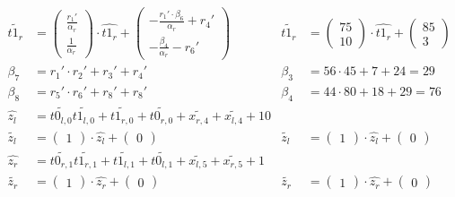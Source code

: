 \begin{align*}
%
\widetilde{t1_r} &=
\begin{pmatrix}
  \frac{r_1'}{\alpha_r}\\
  \frac{1}{\alpha_r}
\end{pmatrix}
\cdot \widehat{t1_r} +
\begin{pmatrix}
  -\frac{r_1' \cdot \beta_6}{\alpha_r} + r_4'\\
  -\frac{\beta_4}{\alpha_r}-r_6'
\end{pmatrix}
&
\widetilde{t1_r} &=
\begin{pmatrix}75\\10\end{pmatrix}
\cdot \widehat{t1_r} +
\begin{pmatrix}85\\3\end{pmatrix}\\
%
\beta_7 &= r_1' \cdot r_2' + r_3' + r_4'
&
 \beta_3 &= 56 \cdot 45 + 7 + 24 = 29\\
%
\beta_8 &= r_5' \cdot r_6' + r_8' + r_8'
&
\beta_4 &= 44 \cdot 80 + 18 + 29 = 76\\
%
\widehat{z_l} &=
\widetilde{t0_{l,0}}\widetilde{t1_{l,0}} +
\widetilde{t1_{r,0}} + \widetilde{t0_{r,0}} + \widetilde{x_{r,4}} +
\widetilde{x_{l,4}} + 10\\
%
\widetilde{z_l} &=
\begin{pmatrix}1\end{pmatrix}
\cdot \widehat{z_l} +
\begin{pmatrix}0\end{pmatrix}
&
\widetilde{z_l} &=
\begin{pmatrix}1\end{pmatrix}
\cdot \widehat{z_l} +
\begin{pmatrix}0\end{pmatrix}\\
%
\widehat{z_r} &=
\widetilde{t0_{r,1}}\widetilde{t1_{r,1}} +
\widetilde{t1_{l,1}} + \widetilde{t0_{l,1}} + \widetilde{x_{l,5}} +
\widetilde{x_{r,5}} + 1\\
%
\widetilde{z_r} &=
\begin{pmatrix}1\end{pmatrix}
\cdot \widehat{z_r} +
\begin{pmatrix}0\end{pmatrix}
&
\widetilde{z_r} &=
\begin{pmatrix}1\end{pmatrix}
\cdot \widehat{z_r} +
\begin{pmatrix}0\end{pmatrix}\\

\end{align*}
